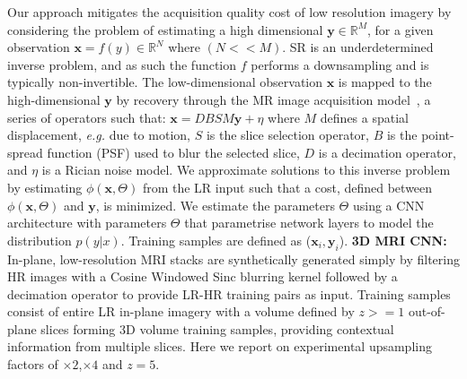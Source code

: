 \documentclass[runningheads,a4paper]{llncs}
\begin{document}
\noindent Our approach mitigates the acquisition quality cost of low resolution imagery by considering the problem of estimating a high dimensional $\mathbf{y} \in \mathbb{R}^M$, for a given observation $\mathbf{x} = f(y) \in \mathbb{R}^N$ where $(N << M)$. SR is an underdetermined inverse problem, and as such the function $f$ performs a downsampling and is typically non-invertible. The low-dimensional observation $\mathbf{x}$ is mapped to the high-dimensional $\mathbf{y}$ by recovery through the MR image acquisition model~\cite{Greenspan2009super}, a series of operators such that: $\mathbf{x}=DBSM\mathbf{y}+\eta$ where $M$ defines a spatial displacement, \emph{e.g.} due to motion, $S$ is the slice selection operator, $B$ is the point-spread function (PSF) used to blur the selected slice, $D$ is a decimation operator, and $\eta$ is a Rician noise model. We approximate solutions to this inverse problem by estimating $\phi(\mathbf{x},\Theta)$ from the LR input such that a cost, defined between $\phi(\mathbf{x},\Theta)$ and $\mathbf{y}$, is minimized. We estimate the parameters $\Theta$ using a CNN architecture with parameters $\Theta$ that parametrise network layers to model the distribution $p(y|x)$. Training samples are defined as ($\mathbf{x}_i,\mathbf{y}_i$).
\newline
\newline
\noindent \textbf{3D MRI CNN:}
In-plane, low-resolution MRI stacks are synthetically generated simply by filtering HR images with a Cosine Windowed Sinc blurring kernel followed by a decimation operator to provide LR-HR training pairs as input. Training samples consist of entire LR in-plane imagery with a volume defined by $z>=1$ out-of-plane slices forming 3D volume training samples, providing contextual information from multiple slices. Here we report on experimental upsampling factors of $\times2$,$\times4$ and $z=5$.

\end{document}
